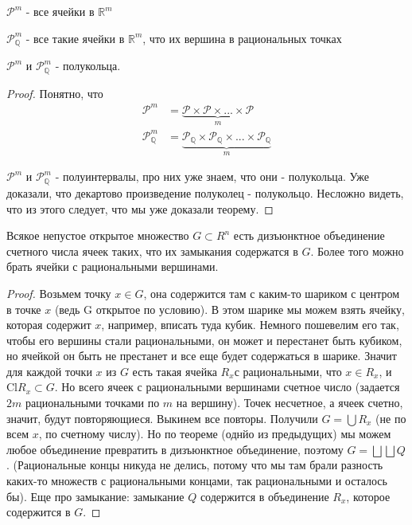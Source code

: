 
\begin{definition} \thmslashn

  $\mathcal{P}^m$ - все ячейки в $\mathbb{R}^m$
  
  $\mathcal{P}^m_{\mathbb{Q}}$ - все такие ячейки в $\mathbb{R}^m$, что их вершина в рациональных точках\\
\end{definition}
\begin{theorem} \thmslashn

  $\mathcal{P}^m$ и $\mathcal{P}^m_{\mathbb{Q}}$ - полукольца.
  \begin{proof} \thmslashn

    Понятно, что
    \begin{align*}
      \mathcal{P}^m &= \underbrace{\mathcal{P} \times \mathcal{P} \times ... \times \mathcal{P}}_m\\
      \mathcal{P}^m_{\mathbb{Q}} &= \underbrace{\mathcal{P}_{\mathbb{Q}} \times \mathcal{P}_{\mathbb{Q}} \times ... \times \mathcal{P}_{\mathbb{Q}}}_m
    \end{align*}
    
    $\mathcal{P}^m$ и $\mathcal{P}^m_{\mathbb{Q}}$ - полуинтервалы, про них уже знаем, что они - полукольца. Уже доказали, что декартово произведение полуколец - полукольцо. Несложно видеть, что из этого следует, что мы уже доказали теорему.
  \end{proof}
\end{theorem}
\begin{theorem} \thmslashn

  Всякое непустое открытое множество $G \subset R^n$ есть дизъюнктное объединение счетного числа ячеек таких, что их замыкания содержатся в $G$. Более того можно брать ячейки с рациональными вершинами.
  \begin{proof} \thmslashn

    Возьмем точку $x\in G$, она содержится там с каким-то шариком с центром в точке $x$ (ведь G открытое по условию). В этом шарике мы можем взять ячейку, которая содержит $x$, например, вписать туда кубик. Немного пошевелим его так, чтобы его вершины стали рациональными, он может и перестанет быть кубиком, но ячейкой он быть не престанет и все еще будет содержаться в шарике. Значит для каждой точки $x$ из $G$ есть такая ячейка $R_x$с рациональными, что $x \in R_x$, и $\text{Cl}R_x\subset G$. Но всего ячеек с рациональными вершинами счетное число (задается $2m$ рациональными точками по $m$ на вершину). Точек несчетное, а ячеек счетно, значит, будут повторяющиеся. Выкинем все повторы. Получили $G = \bigcup R_x$ (не по всем $x$, по счетному числу). Но по теореме (однйо из предыдущих) мы можем любое объединение превратить в дизъюнктное объединение, поэтому $G = \bigsqcup\bigsqcup Q$. (Рациональные концы никуда не делись, потому что мы там брали разность каких-то множеств с рациональными концами, так рациональными и осталось бы). Еще про замыкание: замыкание $Q$ содержится в объединение $R_x$, которое содержится в $G$.
  \end{proof}
\end{theorem}
